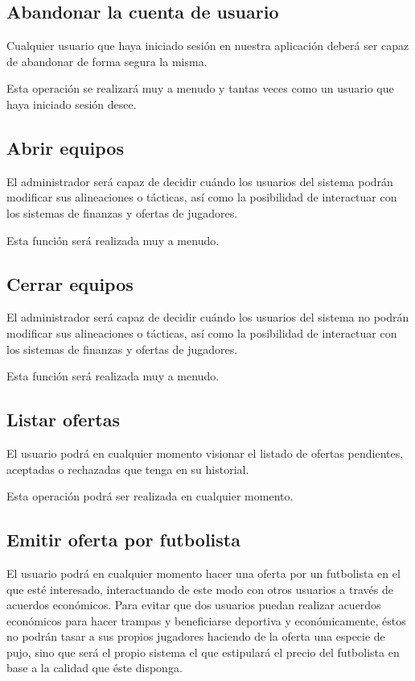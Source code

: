 \subsection*{Abandonar la cuenta de usuario}
Cualquier usuario que haya iniciado sesión en nuestra aplicación deberá ser
capaz de abandonar de forma segura la misma.

Esta operación se realizará muy a menudo y tantas veces como un usuario que haya
iniciado sesión desee.

\subsection*{Abrir equipos}
El administrador será capaz de decidir cuándo los usuarios del sistema podrán
modificar sus alineaciones o tácticas, así como la posibilidad de interactuar
con los sistemas de finanzas y ofertas de jugadores.

Esta función será realizada muy a menudo.

\subsection*{Cerrar equipos}
El administrador será capaz de decidir cuándo los usuarios del sistema no podrán
modificar sus alineaciones o tácticas, así como la posibilidad de interactuar
con los sistemas de finanzas y ofertas de jugadores.

Esta función será realizada muy a menudo.

\subsection*{Listar ofertas}
El usuario podrá en cualquier momento visionar el listado de ofertas pendientes,
aceptadas o rechazadas que tenga en su historial.

Esta operación podrá ser realizada en cualquier momento.

\subsection*{Emitir oferta por futbolista}
El usuario podrá en cualquier momento hacer una oferta por un futbolista en el
que esté interesado, interactuando de este modo con otros usuarios a través de
acuerdos económicos. Para evitar que dos usuarios puedan realizar acuerdos
económicos para hacer trampas y beneficiarse deportiva y económicamente, éstos
no podrán tasar a sus propios jugadores haciendo de la oferta una especie de
pujo, sino que será el propio sistema el que estipulará el precio del futbolista
en base a la calidad que éste disponga.

